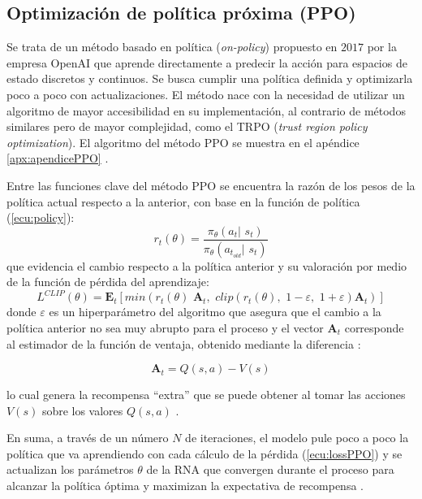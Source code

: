\subsection{Optimización de política próxima (PPO)}

Se trata de un método basado en política (\textit{on-policy}) propuesto en $2017$ por la empresa OpenAI que aprende directamente a predecir la acción para espacios de estado discretos y continuos. Se busca cumplir una política definida y optimizarla poco a poco con actualizaciones. El método nace con la necesidad de utilizar un algoritmo de mayor accesibilidad en su implementación, al contrario de métodos similares pero de mayor complejidad, como el TRPO (\textit{trust region policy optimization}). El algoritmo del método PPO se muestra en el apéndice \ref{apx:apendicePPO} \cite{PPObase}. 

Entre las funciones clave del método PPO se encuentra la razón de los pesos de la política actual respecto a la anterior, con base en la función de política (\ref{ecu:policy}):
\begin{equation}
r_t (\theta) = \frac{\pi_\theta (a_t | \,\, s_t)}{\pi_\theta (a_{t_{old}} |\,\, s_t)}
\end{equation}
que evidencia el cambio respecto a la política anterior y su valoración por medio de la función de pérdida del aprendizaje:
\begin{equation}
L^{CLIP} (\theta) = \mathbf{E}_t \left[min (r_t (\theta) \,\, \mathbf{A}_t ,\,\, clip(r_t(\theta),\,\, 1-\varepsilon,\,\, 1+\varepsilon) \mathbf{A}_t)\right]
\label{ecu:lossPPO}
\end{equation}
donde $\varepsilon$ es un hiperparámetro del algoritmo que asegura que el cambio a la política anterior no sea muy abrupto para el proceso y el vector $\mathbf{A}_t$ corresponde al estimador de la función de ventaja, obtenido mediante la diferencia \cite{PPObase}:

\begin{equation}
\mathbf{A}_t = Q(s,a) - V(s)
\end{equation}

lo cual genera la recompensa ``extra'' que se puede obtener al tomar las acciones $V(s)$ sobre los valores $Q(s,a)$ \cite{PPOadv}.

En suma, a través de un número $N$ de iteraciones, el modelo pule poco a poco la política que va aprendiendo con cada cálculo de la pérdida (\ref{ecu:lossPPO}) y se actualizan los parámetros $\theta$ de la RNA que convergen durante el proceso para alcanzar la política óptima y maximizan la expectativa de recompensa \cite{DataScience}.

